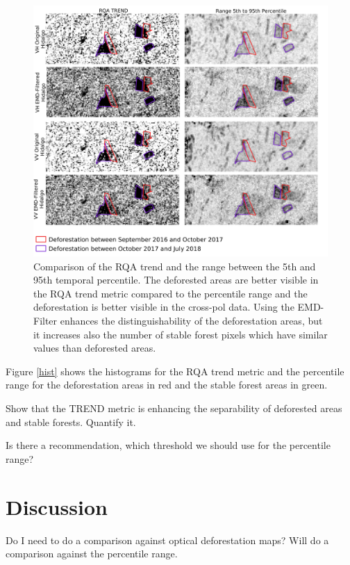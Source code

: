 \documentclass{article}
\begin{document}
\begin{figure}
  \includegraphics[width=\textwidth]{figs/rqa_trend.png}
  \caption{Comparison of the RQA trend and the range between the 5th and 95th temporal percentile.
            The deforested areas are better visible in the RQA trend metric compared to the percentile range
            and the deforestation is better visible in the cross-pol data.
            Using the EMD-Filter enhances the distinguishability of the deforestation areas, but it increases also the number of stable forest pixels which have similar values than deforested areas.}
  \label{trend}
\end{figure}


Figure \ref{hist} shows the histograms for the RQA trend metric and the percentile range for the deforestation areas in red and the stable forest areas in green.

Show that the TREND metric is enhancing the separability of deforested areas and stable forests.
Quantify it.


Is there a recommendation, which threshold we should use for the percentile range?

\section{Discussion}

Do I need to do a comparison against optical deforestation maps?
Will do a comparison against the percentile range.
\end{document}
